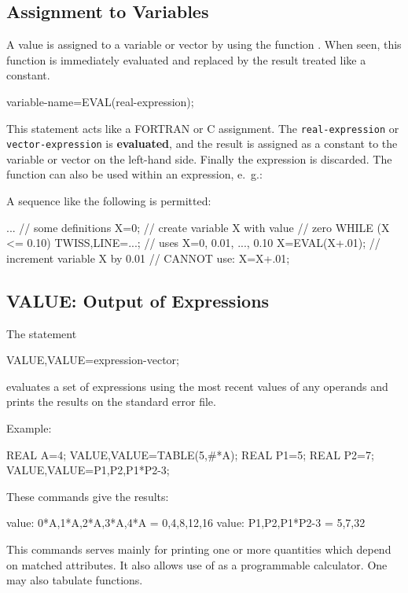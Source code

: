 \subsection{Assignment to Variables}
\label{sec:eval}
A value is assigned to a variable or vector by using the function
.
When seen, this function is immediately evaluated and replaced by the
result treated like a constant.
\begin{example}
variable-name=EVAL(real-expression);
\end{example}
This statement acts like a FORTRAN or C assignment.
The \texttt{real-expression} or \texttt{vector-expression} is
\textbf{evaluated},
and the result is assigned as a constant to the variable or vector on
the left-hand side.
Finally the expression is discarded.
The  function can also be used within an expression, e.~g.:
\begin{example}
vector-name=TABLE(range,EVAL(real-expression));
vector-name={...,EVAL(real-expression),...);
\end{example}
A sequence like the following is permitted:
\begin{example}
...                 // some definitions
X=0;                // create variable X with value
                    // zero
WHILE (X <= 0.10) {
  TWISS,LINE=...;   // uses X=0, 0.01, ..., 0.10
  X=EVAL(X+.01);    // increment variable X by 0.01
                    // CANNOT use: X=X+.01;
}
\end{example}

\subsection{VALUE: Output of Expressions}
\label{sec:value}
The statement
\begin{example}
VALUE,VALUE=expression-vector;
\end{example}
evaluates a set of expressions using the most recent values of
any operands and prints the results on the standard error file.

\noindent Example:
\begin{example}
REAL A=4;
VALUE,VALUE=TABLE(5,#*A);
REAL P1=5;
REAL P2=7;
VALUE,VALUE={P1,P2,P1*P2-3};
\end{example}
These commands give the results:
\begin{example}
value: {0*A,1*A,2*A,3*A,4*A} = {0,4,8,12,16}
value: {P1,P2,P1*P2-3} = {5,7,32}
\end{example}
This commands serves mainly for printing one or more quantities
which depend on matched attributes.
It also allows use of \opal as a programmable calculator.
One may also tabulate functions.


